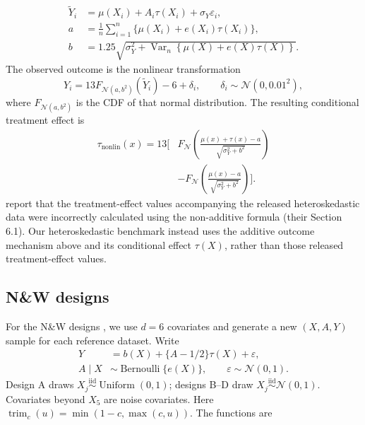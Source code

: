 \[
\begin{aligned}
\widetilde Y_i&=\mu(X_i)+A_i\tau(X_i)+\sigma_Y\varepsilon_i,\\
a&=\frac1n\sum_{i=1}^n\{\mu(X_i)+e(X_i)\tau(X_i)\},\\
b&=1.25\sqrt{\sigma_Y^2+\operatorname{Var}_n\!\left\{\mu(X)+e(X)\tau(X)\right\}}.
\end{aligned}
\]
The observed outcome is the nonlinear transformation
\[
Y_i=13F_{\mathcal N(a,b^2)}(\widetilde Y_i)-6+\delta_i,
\qquad
\delta_i\sim\mathcal N(0,0.01^2),
\]
where \(F_{\mathcal N(a,b^2)}\) is the CDF of that normal distribution. The resulting conditional treatment effect is
\[
\begin{aligned}
\tau_{\mathrm{nonlin}}(x)
=13\Bigg[&
F_{\!\mathcal N}\!\left(
\frac{\mu(x)+\tau(x)-a}{\sqrt{\sigma_Y^2+b^2}}
\right)\\
&-F_{\!\mathcal N}\!\left(
\frac{\mu(x)-a}{\sqrt{\sigma_Y^2+b^2}}
\right)
\Bigg].
\end{aligned}
\]
 report that the treatment-effect values accompanying the released heteroskedastic data were incorrectly calculated using the non-additive formula (their Section 6.1). Our heteroskedastic benchmark instead uses the additive outcome mechanism above and its conditional effect \(\tau(X)\), rather than those released treatment-effect values.

\subsection{N\&W designs}

For the N\&W designs \cite{nieQuasioracleEstimationHeterogeneous2021}, we use \(d=6\) covariates and generate a new \((X,A,Y)\) sample for each reference dataset. Write
\[
\begin{aligned}
Y&=b(X)+\{A-1/2\}\tau(X)+\varepsilon,\\
A\mid X&\sim\operatorname{Bernoulli}\{e(X)\},
\qquad \varepsilon\sim\mathcal N(0,1).
\end{aligned}
\]
Design A draws \(X_j\overset{\mathrm{iid}}{\sim}\operatorname{Uniform}(0,1)\); designs B--D draw \(X_j\overset{\mathrm{iid}}{\sim}\mathcal N(0,1)\). Covariates beyond \(X_5\) are noise covariates. Here \(\operatorname{trim}_{c}(u)=\min(1-c,\max(c,u))\). The functions are

